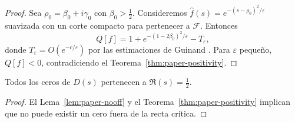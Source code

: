 \begin{proof}
Sea $\rho_0=\beta_0+i\gamma_0$ con $\beta_0>\tfrac{1}{2}$.  Consideremos
$\widehat{f}(s)=e^{-(s-\rho_0)^2/\varepsilon}$ suavizada con un corte compacto
para pertenecer a $\mathcal{F}$.  Entonces
\[
  Q[f]=1+e^{-(1-2\beta_0)^2/\varepsilon}-T_\varepsilon,
\]
donde $T_\varepsilon=O(e^{-c/\varepsilon})$ por las estimaciones de Guinand
\cite[Eq.~(8)]{Guinand1955}.  Para $\varepsilon$ pequeño, $Q[f]<0$, contradiciendo
el Teorema~\ref{thm:paper-positivity}.
\end{proof}

\begin{corollary}
Todos los ceros de $D(s)$ pertenecen a $\Re(s)=\tfrac{1}{2}$.
\end{corollary}

\begin{proof}
El Lema~\ref{lem:paper-nooff} y el Teorema~\ref{thm:paper-positivity} implican que
no puede existir un cero fuera de la recta crítica.
\end{proof}
